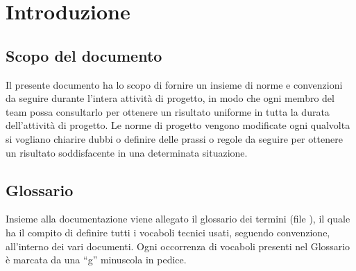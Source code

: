 \section{Introduzione}{
	\subsection{Scopo del documento}{
		Il presente documento ha lo scopo di fornire un insieme di norme e convenzioni da seguire durante l’intera attivit\`{a} di progetto, in modo che ogni membro del team possa consultarlo per ottenere un risultato uniforme in tutta la durata dell’attivit\`{a} di progetto. Le norme di progetto vengono modificate ogni qualvolta si vogliano chiarire dubbi o definire delle prassi o regole da seguire per ottenere un risultato soddisfacente in una determinata situazione.
	 }
	\subsection{Glossario}{ 
	Insieme alla documentazione viene allegato il glossario dei termini (file \href{run:../../Esterni/\fGlossario}{\fEscapeGlossario}), il quale ha il compito di definire tutti i vocaboli tecnici usati, seguendo convenzione, all’interno dei vari documenti.  Ogni occorrenza di vocaboli presenti nel Glossario è marcata da una “g” minuscola in pedice.	
	}
}